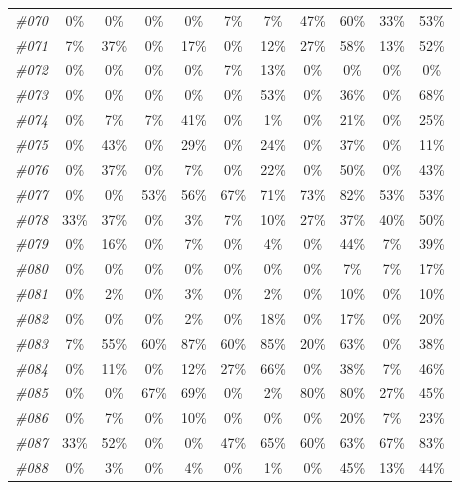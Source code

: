 \begin{table}[t]
\begin{tabular}{ccccccccccc}
    \textit{\#070} & 0\%   & 0\%   & 0\%   & 0\%   & 7\%   & 7\%   & 47\%  & 60\%  & 33\%  & 53\% \\
    \textit{\#071} & 7\%   & 37\%  & 0\%   & 17\%  & 0\%   & 12\%  & 27\%  & 58\%  & 13\%  & 52\% \\
    \textit{\#072} & 0\%   & 0\%   & 0\%   & 0\%   & 7\%   & 13\%  & 0\%   & 0\%   & 0\%   & 0\% \\
    \textit{\#073} & 0\%   & 0\%   & 0\%   & 0\%   & 0\%   & 53\%  & 0\%   & 36\%  & 0\%   & 68\% \\
    \textit{\#074} & 0\%   & 7\%   & 7\%   & 41\%  & 0\%   & 1\%   & 0\%   & 21\%  & 0\%   & 25\% \\
    \textit{\#075} & 0\%   & 43\%  & 0\%   & 29\%  & 0\%   & 24\%  & 0\%   & 37\%  & 0\%   & 11\% \\
    \textit{\#076} & 0\%   & 37\%  & 0\%   & 7\%   & 0\%   & 22\%  & 0\%   & 50\%  & 0\%   & 43\% \\
    \textit{\#077} & 0\%   & 0\%   & 53\%  & 56\%  & 67\%  & 71\%  & 73\%  & 82\%  & 53\%  & 53\% \\
    \textit{\#078} & 33\%  & 37\%  & 0\%   & 3\%   & 7\%   & 10\%  & 27\%  & 37\%  & 40\%  & 50\% \\
    \textit{\#079} & 0\%   & 16\%  & 0\%   & 7\%   & 0\%   & 4\%   & 0\%   & 44\%  & 7\%   & 39\% \\
    \textit{\#080} & 0\%   & 0\%   & 0\%   & 0\%   & 0\%   & 0\%   & 0\%   & 7\%   & 7\%   & 17\% \\
    \textit{\#081} & 0\%   & 2\%   & 0\%   & 3\%   & 0\%   & 2\%   & 0\%   & 10\%  & 0\%   & 10\% \\
    \textit{\#082} & 0\%   & 0\%   & 0\%   & 2\%   & 0\%   & 18\%  & 0\%   & 17\%  & 0\%   & 20\% \\
    \textit{\#083} & 7\%   & 55\%  & 60\%  & 87\%  & 60\%  & 85\%  & 20\%  & 63\%  & 0\%   & 38\% \\
    \textit{\#084} & 0\%   & 11\%  & 0\%   & 12\%  & 27\%  & 66\%  & 0\%   & 38\%  & 7\%   & 46\% \\
    \textit{\#085} & 0\%   & 0\%   & 67\%  & 69\%  & 0\%   & 2\%   & 80\%  & 80\%  & 27\%  & 45\% \\
    \textit{\#086} & 0\%   & 7\%   & 0\%   & 10\%  & 0\%   & 0\%   & 0\%   & 20\%  & 7\%   & 23\% \\
    \textit{\#087} & 33\%  & 52\%  & 0\%   & 0\%   & 47\%  & 65\%  & 60\%  & 63\%  & 67\%  & 83\% \\
    \textit{\#088} & 0\%   & 3\%   & 0\%   & 4\%   & 0\%   & 1\%   & 0\%   & 45\%  & 13\%  & 44\% \\

\end{tabular}
\end{table}
